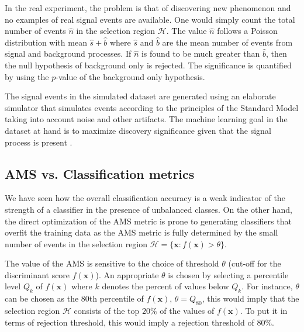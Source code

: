 \documentclass[final,3p,times,twocolumn]{elsarticle}
\begin{document}
In the real experiment, the problem is that of discovering new phenomenon and no examples of real signal events are available. One would simply count the total number of events $\hat{n}$ in the selection region $\mathcal{H}$. The value $\hat{n}$ follows a Poisson distribution with mean $\hat{s} + \hat{b}$ where $\hat{s}$ and $\hat{b}$ are the mean number of events from signal and background processes. If $\hat{n}$ is found to be much greater than $\hat{b}$, then the null hypothesis of background only is rejected. The significance is quantified by using the $p$-value of the background only hypothesis. 

The signal events in the simulated dataset are generated using an elaborate simulator that simulates events according to the principles of the Standard Model taking into account noise and other artifacts. The machine learning goal in the dataset at hand is to maximize discovery significance given that the signal process is present \citep{RM}.  

\subsection{AMS vs. Classification metrics}
\label{performance}

We have seen how the overall classification accuracy is a weak indicator of the strength of a classifier in the presence of unbalanced classes. On the other hand, the direct optimization of the AMS metric is prone to generating classifiers that overfit the training data as the AMS metric is fully determined by the small number of events in the selection region $\mathcal{H} = \{ \textbf{x} : f(\textbf{x}) > \theta\}$.

The value of the AMS is sensitive to the choice of threshold $\theta$ (cut-off for the discriminant score $f(\textbf{x})$). An appropriate $\theta$ is chosen by selecting a percentile level $Q_{k}$ of $f(\textbf{x})$ where $k$ denotes the percent of values below $Q_{k}$. For instance, $\theta$ can be chosen as the 80th percentile of $f(\textbf{x})$, $\theta = Q_{80}$, this would imply that the  selection region $\mathcal{H}$ consists of the top $20\%$ of the values of $f(\textbf{x})$. To put it in terms of rejection threshold, this would imply a rejection threshold of $80\%$.
\end{document}
